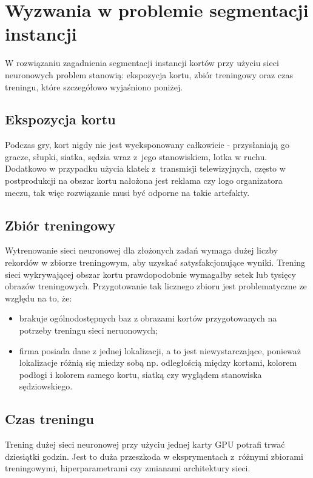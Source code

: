\section{Wyzwania w problemie segmentacji instancji}
\label{sec:wyzwania}

W rozwiązaniu zagadnienia segmentacji instancji kortów przy użyciu sieci neuronowych problem stanowią: ekspozycja kortu, zbiór treningowy oraz czas treningu, które szczegółowo wyjaśniono poniżej.

\subsection*{Ekspozycja kortu}

Podczas gry, kort nigdy nie jest wyeksponowany całkowicie - przysłaniają go gracze, słupki, siatka, sędzia wraz z~jego stanowiskiem, lotka w ruchu.
Dodatkowo w przypadku użycia klatek z~transmisji telewizyjnych, często w postprodukcji na obszar kortu nałożona jest reklama czy logo organizatora meczu,  tak więc rozwiązanie musi być odporne na takie artefakty.

\subsection*{Zbiór treningowy}

Wytrenowanie sieci neuronowej dla złożonych zadań wymaga dużej liczby rekordów w zbiorze treningowym, aby uzyskać satysfakcjonujące wyniki.
Trening sieci wykrywającej obszar kortu prawdopodobnie wymagałby setek lub tysięcy obrazów treningowych.
Przygotowanie tak licznego zbioru jest problematyczne ze względu na to, że:

\begin{itemize}
	\item brakuje ogólnodostępnych baz z obrazami kortów przygotowanych na potrzeby treningu sieci neruonowych;
	\item firma posiada dane z jednej lokalizacji, a to jest niewystarczające, ponieważ lokalizacje różnią się miedzy sobą np. odległością między kortami, kolorem podłogi i kolorem samego kortu, siatką czy wyglądem stanowiska sędziowskiego.
\end{itemize}

\subsection*{Czas treningu}

Trening dużej sieci neuronowej przy użyciu jednej karty GPU potrafi trwać dziesiątki godzin.
Jest to duża przeszkoda w eksprymentach z~różnymi zbiorami treningowymi, hiperparametrami czy zmianami architektury sieci.
